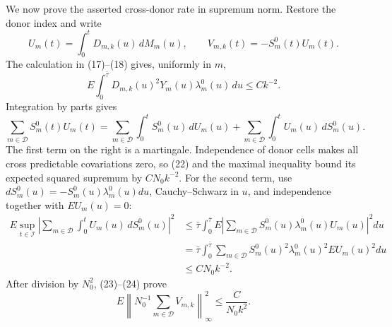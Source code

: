 We now prove the asserted cross-donor rate in supremum norm.  Restore the donor index and write
\[
 U_m(t)=\int_0^tD_{m,k}(u)\,dM_m(u),
 \qquad
 V_{m,k}(t)=-S_m^0(t)U_m(t).
\]
The calculation in (17)--(18) gives, uniformly in \(m\),
\[
 E\int_0^{\bar\tau}D_{m,k}(u)^2Y_m(u)\lambda_m^0(u)\,du
 \le Ck^{-2}.                                                   \tag{22}
\]
Integration by parts gives
\[
 \sum_{m\in\mathcal D}S_m^0(t)U_m(t)
 =\sum_{m\in\mathcal D}\int_0^tS_m^0(u)\,dU_m(u)
  +\sum_{m\in\mathcal D}\int_0^tU_m(u)\,dS_m^0(u).          \tag{23}
\]
The first term on the right is a martingale.  Independence of donor cells makes all cross predictable covariations zero, so (22) and the maximal inequality bound its expected squared supremum by \(CN_0k^{-2}\).  For the second term, use \(dS_m^0(u)=-S_m^0(u)\lambda_m^0(u)du\), Cauchy--Schwarz in \(u\), and independence together with \(EU_m(u)=0\):
\[
 \begin{aligned}
 E\sup_{t\in\mathcal I}
 \left|\sum_{m\in\mathcal D}\int_0^tU_m(u)\,dS_m^0(u)\right|^2
 &\le \bar\tau\int_0^{\bar\tau}
 E\left|\sum_{m\in\mathcal D}S_m^0(u)\lambda_m^0(u)U_m(u)\right|^2du\\
 &=\bar\tau\int_0^{\bar\tau}\sum_{m\in\mathcal D}
 S_m^0(u)^2\lambda_m^0(u)^2EU_m(u)^2du\\
 &\le CN_0k^{-2}.
 \end{aligned}                                                 \tag{24}
\]
After division by \(N_0^2\), (23)--(24) prove
\[
 E\left\|N_0^{-1}\sum_{m\in\mathcal D}V_{m,k}\right\|_\infty^2
 \le \frac{C}{N_0k^2}.                                      \tag{25}
\]

